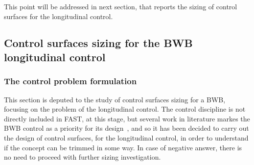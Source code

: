 This point will be addressed in next section, that reports the sizing of control surfaces for the longitudinal control. 

\subsection{Control surfaces sizing for the BWB longitudinal control}
\label{subsec:chap4_bwb_control}

\subsubsection{The control problem formulation}
\label{subsubsec:chap4_bwb_control_prob_formulation}

This section is deputed to the study of control surfaces sizing for a BWB, focusing on the problem of the longitudinal control. 
The control discipline is not directly included in FAST, at this stage, but several work in literature markes the BWB control as a priority for its design~\cite{bib:nickel, bib:kozek, bib:perry, bib:wang, bib:ashkenas}, and so it has been decided to carry out the design of control surfaces, for the longitudinal control, in order to understand if the concept can be trimmed in some way. 
In case of negative answer, there is no need to proceed with further sizing investigation. 

